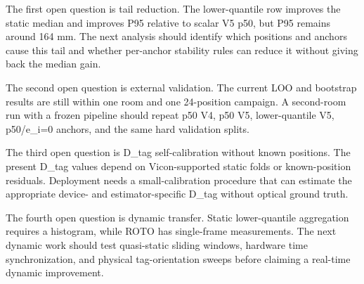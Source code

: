 \documentclass[11pt,a4paper]{article}
\begin{document}
The first open question is tail reduction. The lower-quantile row improves the static median and improves P95 relative to scalar V5 p50, but P95 remains around 164 mm. The next analysis should identify which positions and anchors cause this tail and whether per-anchor stability rules can reduce it without giving back the median gain.

The second open question is external validation. The current LOO and bootstrap results are still within one room and one 24-position campaign. A second-room run with a frozen pipeline should repeat p50 V4, p50 V5, lower-quantile V5, p50/e\_i=0 anchors, and the same hard validation splits.

The third open question is D\_tag self-calibration without known positions. The present D\_tag values depend on Vicon-supported static folds or known-position residuals. Deployment needs a small-calibration procedure that can estimate the appropriate device- and estimator-specific D\_tag without optical ground truth.

The fourth open question is dynamic transfer. Static lower-quantile aggregation requires a histogram, while ROTO has single-frame measurements. The next dynamic work should test quasi-static sliding windows, hardware time synchronization, and physical tag-orientation sweeps before claiming a real-time dynamic improvement.
\end{document}
